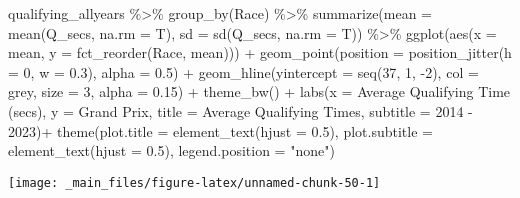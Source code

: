 \documentclass[
]{book}
\newenvironment{Shaded}{\begin{snugshade}}{\end{snugshade}}
\newcommand{\AttributeTok}[1]{\textcolor[rgb]{0.77,0.63,0.00}{#1}}
\newcommand{\DecValTok}[1]{\textcolor[rgb]{0.00,0.00,0.81}{#1}}
\newcommand{\FloatTok}[1]{\textcolor[rgb]{0.00,0.00,0.81}{#1}}
\newcommand{\FunctionTok}[1]{\textcolor[rgb]{0.00,0.00,0.00}{#1}}
\newcommand{\NormalTok}[1]{#1}
\newcommand{\SpecialCharTok}[1]{\textcolor[rgb]{0.00,0.00,0.00}{#1}}
\newcommand{\StringTok}[1]{\textcolor[rgb]{0.31,0.60,0.02}{#1}}
\begin{document}
\begin{Shaded}
\begin{Highlighting}[]
\NormalTok{qualifying\_allyears }\SpecialCharTok{\%\textgreater{}\%}
  \FunctionTok{group\_by}\NormalTok{(Race) }\SpecialCharTok{\%\textgreater{}\%}
  \FunctionTok{summarize}\NormalTok{(}\AttributeTok{mean =} \FunctionTok{mean}\NormalTok{(Q\_secs, }\AttributeTok{na.rm =}\NormalTok{ T),}
            \AttributeTok{sd =} \FunctionTok{sd}\NormalTok{(Q\_secs, }\AttributeTok{na.rm =}\NormalTok{ T)) }\SpecialCharTok{\%\textgreater{}\%} 
  \FunctionTok{ggplot}\NormalTok{(}\FunctionTok{aes}\NormalTok{(}\AttributeTok{x =}\NormalTok{ mean, }\AttributeTok{y =} \FunctionTok{fct\_reorder}\NormalTok{(Race, mean))) }\SpecialCharTok{+}
  \FunctionTok{geom\_point}\NormalTok{(}\AttributeTok{position =} \FunctionTok{position\_jitter}\NormalTok{(}\AttributeTok{h =} \DecValTok{0}\NormalTok{, }\AttributeTok{w =} \FloatTok{0.3}\NormalTok{), }\AttributeTok{alpha =} \FloatTok{0.5}\NormalTok{) }\SpecialCharTok{+}
  \FunctionTok{geom\_hline}\NormalTok{(}\AttributeTok{yintercept =} \FunctionTok{seq}\NormalTok{(}\DecValTok{37}\NormalTok{, }\DecValTok{1}\NormalTok{, }\SpecialCharTok{{-}}\DecValTok{2}\NormalTok{), }\AttributeTok{col =} \StringTok{\textquotesingle{}grey\textquotesingle{}}\NormalTok{, }\AttributeTok{size =} \DecValTok{3}\NormalTok{, }\AttributeTok{alpha =} \FloatTok{0.15}\NormalTok{) }\SpecialCharTok{+}
  \FunctionTok{theme\_bw}\NormalTok{() }\SpecialCharTok{+}
  \FunctionTok{labs}\NormalTok{(}\AttributeTok{x =} \StringTok{\textquotesingle{}Average Qualifying Time (secs)\textquotesingle{}}\NormalTok{,}
       \AttributeTok{y =} \StringTok{\textquotesingle{}Grand Prix\textquotesingle{}}\NormalTok{,}
       \AttributeTok{title =} \StringTok{\textquotesingle{}Average Qualifying Times\textquotesingle{}}\NormalTok{,}
       \AttributeTok{subtitle =} \StringTok{\textquotesingle{}2014 {-} 2023\textquotesingle{}}\NormalTok{)}\SpecialCharTok{+}
  \FunctionTok{theme}\NormalTok{(}\AttributeTok{plot.title =} \FunctionTok{element\_text}\NormalTok{(}\AttributeTok{hjust =} \FloatTok{0.5}\NormalTok{),}
        \AttributeTok{plot.subtitle =} \FunctionTok{element\_text}\NormalTok{(}\AttributeTok{hjust =} \FloatTok{0.5}\NormalTok{),}
        \AttributeTok{legend.position =} \StringTok{"none"}\NormalTok{)}
\end{Highlighting}
\end{Shaded}

\begin{center}\texttt{[image: \_main\_files/figure-latex/unnamed-chunk-50-1]} \end{center}
\end{document}
